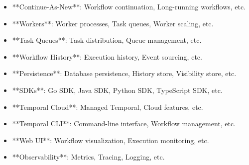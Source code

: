 \documentclass[11pt,a4paper]{article}
\begin{document}
\begin{itemize}
\item **Continue-As-New**: Workflow continuation, Long-running workflows, etc.
\end{itemize}

\begin{itemize}
\item **Workers**: Worker processes, Task queues, Worker scaling, etc.
\end{itemize}

\begin{itemize}
\item **Task Queues**: Task distribution, Queue management, etc.
\end{itemize}

\begin{itemize}
\item **Workflow History**: Execution history, Event sourcing, etc.
\end{itemize}

\begin{itemize}
\item **Persistence**: Database persistence, History store, Visibility store, etc.
\end{itemize}

\begin{itemize}
\item **SDKs**: Go SDK, Java SDK, Python SDK, TypeScript SDK, etc.
\end{itemize}

\begin{itemize}
\item **Temporal Cloud**: Managed Temporal, Cloud features, etc.
\end{itemize}

\begin{itemize}
\item **Temporal CLI**: Command-line interface, Workflow management, etc.
\end{itemize}

\begin{itemize}
\item **Web UI**: Workflow visualization, Execution monitoring, etc.
\end{itemize}

\begin{itemize}
\item **Observability**: Metrics, Tracing, Logging, etc.
\end{itemize}
\end{document}
